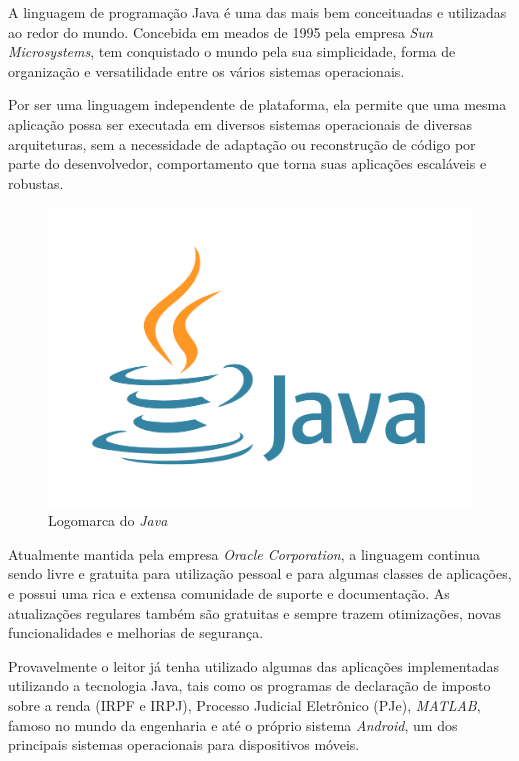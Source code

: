 \documentclass[
	12pt,			%
	openright,		%
	oneside,	
	a4paper,		%
	english,		%
	brazil			%
]{abntex2/abntex2}  %
\begin{document}
	A linguagem de programação Java \cite{java} é uma das mais bem conceituadas e utilizadas ao redor do mundo. Concebida em meados de 1995 pela empresa \textit{Sun Microsystems}, tem conquistado o mundo pela sua simplicidade, forma de organização e versatilidade entre os vários sistemas operacionais.
	
	Por ser uma linguagem independente de plataforma, ela permite que uma mesma aplicação possa ser executada em diversos sistemas operacionais de diversas arquiteturas, sem a necessidade de adaptação ou reconstrução de código por parte do desenvolvedor, comportamento que torna suas aplicações escaláveis e robustas.
	
	\begin{figure}[H]
		
		\caption{\label{java-logo}Logomarca do \textit{Java}}
		\begin{center}
			\includegraphics[scale=0.04]{img/java-logo}
		\end{center}
		
	\end{figure}
	
	Atualmente mantida pela empresa \textit{Oracle Corporation}, a linguagem continua sendo livre e gratuita para utilização pessoal e para algumas classes de aplicações, e possui uma rica e extensa comunidade de suporte e documentação. As atualizações regulares também são gratuitas e sempre trazem otimizações, novas funcionalidades e melhorias de segurança.

	Provavelmente o leitor já tenha utilizado algumas das aplicações implementadas utilizando a tecnologia Java, tais como os programas de declaração de imposto sobre a renda (IRPF e IRPJ), Processo Judicial Eletrônico (PJe), \textit{MATLAB}, famoso no mundo da engenharia e até o próprio sistema \textit{Android}, um dos principais sistemas operacionais para dispositivos móveis.
	
\end{document}
